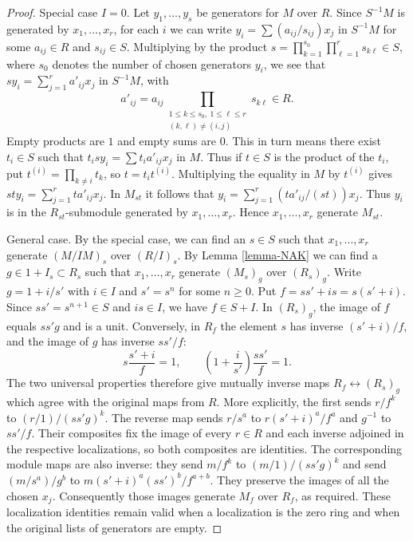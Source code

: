 \begin{proof}
Special case $I = 0$. Let $y_1, \ldots, y_s$ be generators for $M$ over $R$.
Since $S^{-1}M$ is generated by $x_1, \ldots, x_r$, for each $i$
we can write $y_i = \sum (a_{ij}/s_{ij})x_j$ in $S^{-1}M$
for some $a_{ij} \in R$ and $s_{ij} \in S$. Multiplying by the product
$s=\prod_{k=1}^{s_0}\prod_{\ell=1}^r s_{k\ell}\in S$,
where $s_0$ denotes the number of chosen generators $y_i$, we see that
$sy_i = \sum_{j=1}^r a'_{ij}x_j$ in $S^{-1}M$, with
$$
a'_{ij}=a_{ij}
\prod_{\substack{1\leq k\leq s_0,\ 1\leq\ell\leq r\\(k,\ell)\ne(i,j)}}
s_{k\ell}\in R.
$$
Empty products are $1$ and empty sums are $0$.
This in turn means there exist $t_i \in S$ such that
$t_isy_i = \sum t_ia'_{ij}x_j$ in $M$. Thus if $t \in S$
is the product of the $t_i$, put
$t^{(i)}=\prod_{k\ne i}t_k$, so $t=t_it^{(i)}$.
Multiplying the equality in $M$ by $t^{(i)}$ gives
$sty_i=\sum_{j=1}^r t a'_{ij}x_j$.
In $M_{st}$ it follows that
$y_i=\sum_{j=1}^r(t a'_{ij}/(st))x_j$.
Thus $y_i$ is in the $R_{st}$-submodule generated by
$x_1,\ldots,x_r$. Hence $x_1, \ldots, x_r$ generate $M_{st}$.

\medskip\noindent
General case. By the special case, we can find an $s \in S$
such that $x_1, \ldots, x_r$ generate $(M/IM)_s$ over $(R/I)_s$.
By Lemma \ref{lemma-NAK} we can find a $g \in 1 + I_s \subset R_s$
such that $x_1, \ldots, x_r$ generate $(M_s)_g$ over $(R_s)_g$.
Write $g=1+i/s'$ with $i\in I$ and $s'=s^n$ for some
$n\geq0$. Put $f=ss'+is=s(s'+i)$. Since $ss'=s^{n+1}\in S$
and $is\in I$, we have $f\in S+I$.
In $(R_s)_g$, the image of $f$ equals $ss'g$ and is a unit.
Conversely, in $R_f$ the element $s$ has inverse $(s'+i)/f$,
and the image of $g$ has inverse $ss'/f$:
$$
s\frac{s'+i}{f}=1,\qquad
\left(1+\frac{i}{s'}\right)\frac{ss'}{f}=1.
$$
The two universal properties therefore give mutually inverse maps
$R_f\longleftrightarrow(R_s)_g$ which agree with the original
maps from $R$. More explicitly, the first sends $r/f^k$ to
$(r/1)/(ss'g)^k$. The reverse map sends
$r/s^a$ to $r(s'+i)^a/f^a$ and $g^{-1}$ to $ss'/f$.
Their composites fix the image of every $r\in R$ and each inverse
adjoined in the respective localizations, so both composites are identities.
The corresponding module maps are also inverse: they send
$m/f^k$ to $(m/1)/(ss'g)^k$ and send
$(m/s^a)/g^b$ to $m(s'+i)^a(ss')^b/f^{a+b}$.
They preserve the images of all the chosen $x_j$.
Consequently those images generate $M_f$ over $R_f$, as required.
These localization identities remain valid when a localization is
the zero ring and when the original lists of generators are empty.
\end{proof}